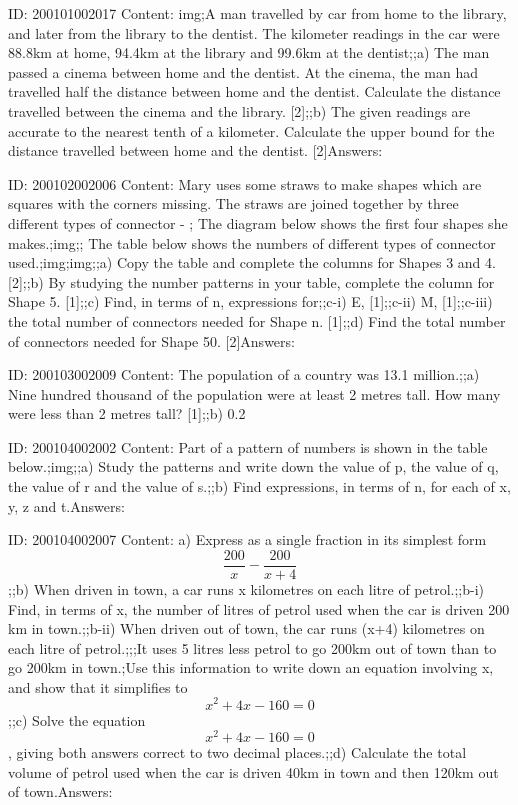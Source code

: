 \documentclass{article}
\begin{document}
ID: 200101002017
Content:
img;A man travelled by car from home to the library, and later from the library to the dentist. The kilometer readings in the car were 88.8km at home, 94.4km at the library and 99.6km at the dentist;;a) The man passed a cinema between home and the dentist. At the cinema, the man had travelled half the distance between home and the dentist. Calculate the distance travelled between the cinema and the library. [2];;b) The given readings are accurate to the nearest tenth of a kilometer. Calculate the upper bound for the distance travelled between home and the dentist. [2]Answers:

ID: 200102002006
Content:
Mary uses some straws to make shapes which are squares with the corners missing. The straws are joined together by three different types of connector - ; The diagram below shows the first four shapes she makes.;img;; The table below shows the numbers of different types of connector used.;img;img;;a) Copy the table and complete the columns for Shapes 3 and 4. [2];;b) By studying the number patterns in your table, complete the column for Shape 5. [1];;c) Find, in terms of n, expressions for;;c-i) E, [1];;c-ii) M, [1];;c-iii) the total number of connectors needed for Shape n. [1];;d) Find the total number of connectors needed for Shape 50. [2]Answers:

ID: 200103002009
Content:
The population of a country was 13.1 million.;;a) Nine hundred thousand of the population were at least 2 metres tall. How many were less than 2 metres tall?    [1];;b) 0.2%

ID: 200104002002
Content:
Part of a pattern of numbers is shown in the table below.;img;;a) Study the patterns and write down the value of p, the value of q, the value of r and the value of s.;;b) Find expressions, in terms of n, for each of x, y, z and t.Answers:

ID: 200104002007
Content:
a) Express as a single fraction in its simplest form $$\frac{200}{x} - \frac{200}{x +4} $$;;b) When driven in town, a car runs x kilometres on each litre of petrol.;;b-i) Find, in terms of x, the number of litres of petrol used when the car is driven 200 km in town.;;b-ii) When driven out of town, the car runs (x+4) kilometres on each litre of petrol.;;;It uses 5 litres less petrol to go 200km out of town than to go 200km in town.;Use this information to write down an equation involving x, and show that it simplifies to $$x^2 + 4x - 160 = 0$$;;c) Solve the equation $$x^2 + 4x - 160 = 0$$, giving both answers correct to two decimal places.;;d) Calculate the total volume of petrol used when the car is driven 40km in town and then 120km out of town.Answers:
\end{document}
